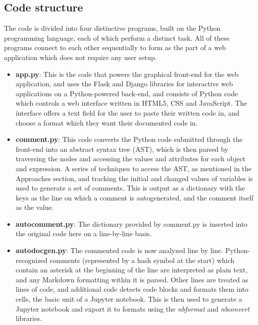 \documentclass[fleqn,10pt]{wlscirep}
\begin{document}
\subsection*{Code structure}
The code is divided into four distinctive programs, built on the Python programming language, each of which perform a distinct task. All of these programs connect to each other sequentially to form as the part of a web application which does not require any user setup.
\begin{itemize}
\item \textbf{app.py}: This is the code that powers the graphical front-end for the web application, and uses the Flask and Django libraries for interactive web applications on a Python-powered back-end, and consists of Python code which controls a web interface written in HTML5, CSS and JavaScript. The interface offers a text field for the user to paste their written code in, and choose a format which they want their documented code in. 
\item \textbf{comment.py}: This code converts the Python code submitted through the front-end into an abstract syntax tree (AST), which is then parsed by traversing the nodes and accessing the values and attributes for each object and expression. A series of techniques to access the AST, as mentioned in the Approaches section, and tracking the initial and changed values of variables is used to generate a set of comments. This is output as a dictionary with the keys as the line on which a comment is autogenerated, and the comment itself as the value.
\item \textbf{autocomment.py}: The dictionary provided by comment.py is inserted into the original code here on a line-by-line basis.
\item \textbf{autodocgen.py}: The commented code is now analyzed line by line. Python-recognized comments (represented by a hash symbol at the start) which contain an asterisk at the beginning of the line are interpreted as plain text, and any Markdown formatting within it is parsed. Other lines are treated as lines of code, and additional code detects code blocks and formats them into cells, the basic unit of a Jupyter notebook. This is then used to generate a Jupyter notebook and export it to formats using the \textit{nbformat} and \textit{nbconvert} libraries. 
\end{itemize}
\end{document}
